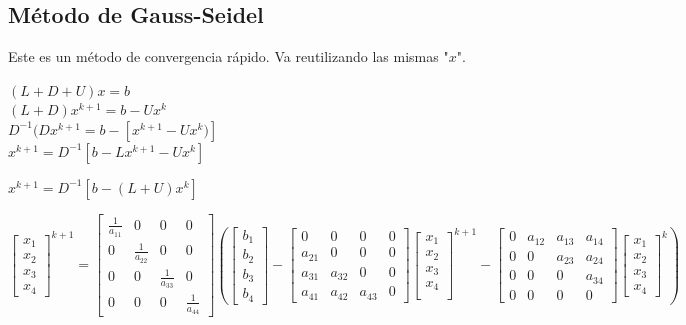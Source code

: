\subsection{M\'etodo de Gauss-Seidel}
Este es un m\'etodo de convergencia r\'apido. Va reutilizando las mismas "$x$".
\begin{center}
$(L+D+U)x=b$ \\
$(L+D)x^{k+1}=b-Ux^k$ \\
$D^{-1}(Dx^{k+1}=b-[x^{k+1}-Ux^k)]$ \\
$x^{k+1}=D^{-1}[b-Lx^{k+1}-Ux^k]$ 
\end{center}
\begin{center}$x^{k+1}=D^{-1}[b-(L+U)x^k]$\end{center}
\begin{center}$\begin{bmatrix}
x_1 \\ x_2 \\ x_3 \\ x_4 
\end{bmatrix}^{k+1}=\begin{bmatrix}
\frac{1}{a_{11}} & 0 & 0 & 0 \\
0 & \frac{1}{a_{22}} & 0 & 0 \\
0 & 0 & \frac{1}{a_{33}} & 0 \\
0 & 0 & 0 & \frac{1}{a_{44}}
\end{bmatrix}\left(\begin{bmatrix}
b_1 \\ b_2 \\ b_3 \\ b_4
\end{bmatrix}-\begin{bmatrix}
0 & 0 & 0 & 0 \\
a_{21} & 0 & 0 & 0 \\
a_{31} & a_{32} & 0 & 0 \\
a_{41} & a_{42} & a_{43} & 0
\end{bmatrix}\begin{bmatrix}
x_1 \\ x_2 \\ x_3 \\ x_4\\
\end{bmatrix}^{k+1}-\begin{bmatrix}
0 & a_{12} & a_{13} & a_{14} \\
0 & 0 & a_{23} & a_{24} \\
0 & 0 & 0 & a_{34} \\
0 & 0 & 0 & 0
\end{bmatrix} \begin{bmatrix}
x_1 \\ x_2 \\ x_3 \\ x_4
\end{bmatrix}^k \right)$
\end{center}
